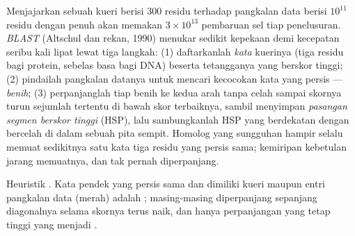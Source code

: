 \begin{definition}[BLAST]\label{def:b3:bioinformatics:blast}
Menjajarkan sebuah kueri berisi \num{300} residu terhadap pangkalan data
berisi $10^{11}$ residu dengan  penuh akan memakan
$3\times 10^{13}$ pembaruan sel tiap penelusuran. \emph{BLAST} (Altschul dan
rekan, 1990) menukar sedikit kepekaan demi kecepatan seribu kali lipat lewat
tiga langkah: (1) daftarkanlah \emph{kata} kuerinya (tiga residu bagi protein,
sebelas basa bagi DNA) beserta tetangganya yang berskor tinggi; (2) pindailah
pangkalan datanya untuk mencari kecocokan kata yang persis --- \emph{benih};
(3) perpanjanglah tiap benih ke kedua arah tanpa celah sampai skornya turun
sejumlah tertentu di bawah skor terbaiknya, sambil menyimpan \emph{pasangan
segmen berskor tinggi} (HSP), lalu sambungkanlah HSP yang berdekatan dengan
 bercelah di dalam sebuah pita sempit. Homolog yang
sungguhan hampir selalu memuat sedikitnya satu kata tiga residu yang persis
sama; kemiripan kebetulan jarang memuatnya, dan tak pernah diperpanjang.
\end{definition}

\begin{omfigure}

{\small Heuristik . Kata pendek yang persis sama dan dimiliki kueri
maupun entri pangkalan data (merah) adalah ; masing-masing diperpanjang
sepanjang diagonalnya selama skornya terus naik, dan hanya perpanjangan yang
tetap tinggi yang menjadi .}
\end{omfigure}

